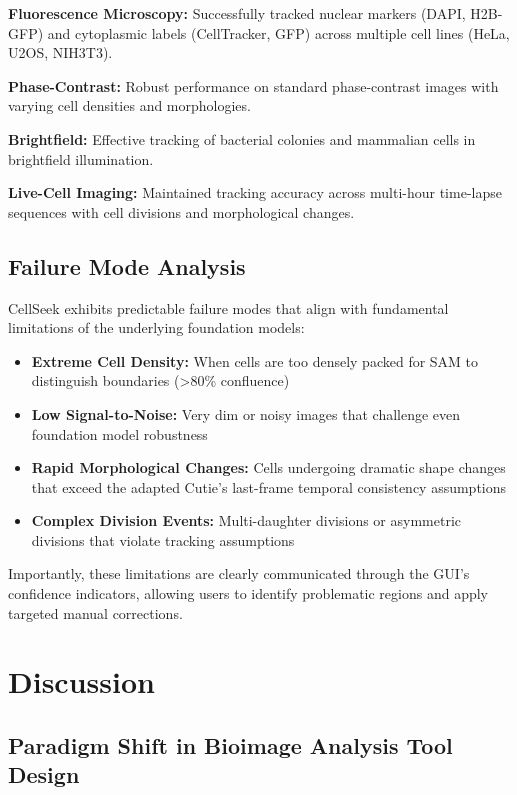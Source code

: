 \documentclass[12pt]{article}
\begin{document}
\textbf{Fluorescence Microscopy:} Successfully tracked nuclear markers (DAPI, H2B-GFP) and cytoplasmic labels (CellTracker, GFP) across multiple cell lines (HeLa, U2OS, NIH3T3).

\textbf{Phase-Contrast:} Robust performance on standard phase-contrast images with varying cell densities and morphologies.

\textbf{Brightfield:} Effective tracking of bacterial colonies and mammalian cells in brightfield illumination.

\textbf{Live-Cell Imaging:} Maintained tracking accuracy across multi-hour time-lapse sequences with cell divisions and morphological changes.

\subsection{Failure Mode Analysis}

CellSeek exhibits predictable failure modes that align with fundamental limitations of the underlying foundation models:

\begin{itemize}
  \item \textbf{Extreme Cell Density:} When cells are too densely packed for SAM to distinguish boundaries (>80\% confluence)
  \item \textbf{Low Signal-to-Noise:} Very dim or noisy images that challenge even foundation model robustness
  \item \textbf{Rapid Morphological Changes:} Cells undergoing dramatic shape changes that exceed the adapted Cutie's last-frame temporal consistency assumptions
  \item \textbf{Complex Division Events:} Multi-daughter divisions or asymmetric divisions that violate tracking assumptions
\end{itemize}

Importantly, these limitations are clearly communicated through the GUI's confidence indicators, allowing users to identify problematic regions and apply targeted manual corrections.

\section{Discussion}

\subsection{Paradigm Shift in Bioimage Analysis Tool Design}
\end{document}
